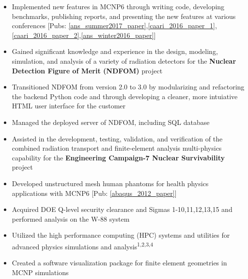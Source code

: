 \begin{minipage}{\textwidth}
    \begin{center}
	\begin{itemize}
	    \item Implemented new features in \textsc{MCNP6} through writing code, developing benchmarks, publishing reports, 
		    and presenting the new features at various conferences [Pubs: \ref{ans_summer2017_paper},\ref{caari_2016_paper_1},\ref{caari_2016_paper_2},\ref{ans_winter2016_paper}]\none 
	    \item Gained significant knowledge and experience in the design, modeling, simulation, and analysis 
		    of a variety of radiation detectors for the \textbf{Nuclear Detection Figure of Merit (NDFOM)} project\ntwo
	    \item Transitioned NDFOM from version 2.0 to 3.0 by modularizing and refactoring the backend 
		   Python code and through developing a cleaner, more intuiative HTML user interface for the customer\ntwo
	    \item Managed the deployed server of NDFOM, including SQL database\ntwo
	    \item Assisted in the development, testing, validation, and verification of the combined radiation transport and 
		    finite-element analysis multi-physics capability for the \textbf{Engineering Campaign-7 Nuclear Survivability} project\nthree
	    \item Developed unstructured mesh human phantoms for health physics applications with \textsc{MCNP6} [Pub: \ref{abaqus_2012_paper}]\nthree
	    \item Acquired DOE Q-level security clearance and Sigmas 1-10,11,12,13,15 and performed analysis on the W-88 system\nthree
	    \item Utilized the high performance computing (HPC) systems and utilities for advanced physics simulations and analysis\textsuperscript{1,2,3,4}
	    \item Created a software visualization package for finite element geometries in MCNP simulations\nfour

\end{itemize}
\end{center}
\end{minipage}
